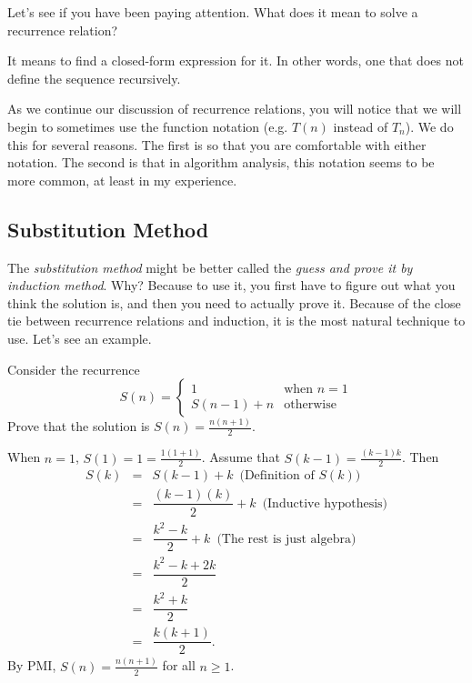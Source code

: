 \begin{ques}
Let's see if you have been paying attention.  
What does it mean to solve a recurrence relation?

\noindent
\answerlinetwo
\begin{answer}
It means to find a closed-form expression for it.  In other words, one that does not
define the sequence recursively.
\end{answer}
\end{ques}

As we continue our discussion of recurrence relations, you will notice that we will begin to
sometimes use the function notation (e.g. $T(n)$ instead of $T_n$).  
We do this for several reasons.  The first is so that you are comfortable with either notation.
The second is that in algorithm analysis, this notation seems to be more common,
at least in my experience.

\subsection{Substitution Method}
The {\em substitution method} might be better called the 
{\em guess and prove it by induction method}. 
Why?  Because to use it, you first have to figure out what you think the
solution is, and then you need to actually prove it.  Because of the close
tie between recurrence relations and induction, it is the most natural technique to use.
Let's see an example.
\begin{exa}
Consider the recurrence 
$$
S(n) = \left\{ 
\begin{array}{ll}
1&\mbox{when $n = 1$}\\
S(n-1) + n & \mbox{otherwise}
\end{array}
\right.
$$
Prove that the solution is 
${\displaystyle S(n)=\frac{n(n+1)}{2}.}$

\medskip
\noindent
\begin{pf}
When $n=1$, $S(1)=1 = \frac{1(1+1)}{2}$.
Assume that $S(k-1)=\frac{(k-1)k}{2}$.
Then
\begin{eqnarray*}
S(k)&=&S(k-1)+k\, \, \, \mbox{(Definition of }S(k)\mbox{)}\\
&=&\dfrac{(k-1)(k)}{2}+k\, \, \, \mbox{(Inductive hypothesis)}\\
&=&\dfrac{k^2-k}{2}+k\, \, \, \mbox{(The rest is just algebra)}\\
&=&\dfrac{k^2-k+2 k}{2}\\
&=&\dfrac{k^2+k}{2}\\
&=&\dfrac{k(k+1)}{2}.
\end{eqnarray*}
By PMI, $S(n)=\frac{n(n+1)}{2}$ for all $n\geq 1$.
\end{pf}
\end{exa}

